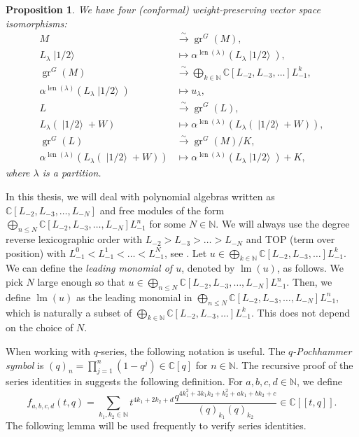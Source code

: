 \documentclass[a4paper, 12pt, reqno]{amsart}
\newtheorem{proposition}[theorem]{Proposition}
\theoremstyle{remark}
\DeclareMathOperator{\gr}{gr}
\DeclareMathOperator{\lm}{lm}
\DeclareMathOperator{\len}{len}
\DeclareMathOperator{\vachalf}{|1/2\rangle}
\begin{document}
\begin{proposition}
  \label{prp:20}
  We have four (conformal) weight-preserving vector space isomorphisms:
  \begin{align*}
    M &\xrightarrow{\sim} \gr^G(M), \\
    L_{\lambda}\vachalf &\mapsto \alpha^{\len(\lambda)}(L_{\lambda}\vachalf), \\
    \gr^G(M) &\xrightarrow{\sim} \bigoplus_{k \in \mathbb{N}}\mathbb{C}[L_{-2}, L_{-3}, \dots]L_{-1}^k, \\
    \alpha^{\len(\lambda)}(L_{\lambda}\vachalf) &\mapsto u_{\lambda}, \\
    L &\xrightarrow{\sim} \gr^G(L), \\
    L_{\lambda}(\vachalf + W) &\mapsto \alpha^{\len(\lambda)}(L_{\lambda}(\vachalf + W)), \\
    \gr^G(L) &\xrightarrow{\sim} \gr^G(M)/K, \\
    \alpha^{\len(\lambda)}(L_{\lambda}(\vachalf + W)) &\mapsto \alpha^{\len(\lambda)}(L_{\lambda}\vachalf) + K,
  \end{align*}
  where $\lambda$ is a partition.
\end{proposition}

In this thesis, we will deal with polynomial algebras written as $\mathbb{C}[L_{-2}, L_{-3}, \dots, L_{-N}]$ and free modules of the form $\bigoplus_{n \le N}\mathbb{C}[L_{-2}, L_{-3}, \dots, L_{-N}]L_{-1}^n$ for some $N \in \mathbb{N}$.
We will always use the degree reverse lexicographic order with $L_{-2} > L_{-3} > \dots > L_{-N}$ and TOP (term over position) with $L_{-1}^0 < L_{-1}^1 < \dots < L_{-1}^N$, see \cite[\S3.5]{adams_introduction_1994}.
Let $u \in \bigoplus_{k \in \mathbb{N}}\mathbb{C}[L_{-2}, L_{-3}, \dots]L_{-1}^k$.
We can define the \emph{leading monomial of $u$}, denoted by $\lm(u)$, as follows.
We pick $N$ large enough so that $u \in \bigoplus_{n \le N}\mathbb{C}[L_{-2}, L_{-3}, \dots, L_{-N}]L_{-1}^n$.
Then, we define $\lm(u)$ as the leading monomial in $\bigoplus_{n \le N}\mathbb{C}[L_{-2}, L_{-3}, \dots, L_{-N}]L_{-1}^n$, which is naturally a subset of $\bigoplus_{k \in \mathbb{N}}\mathbb{C}[L_{-2}, L_{-3}, \dots]L_{-1}^k$.
This does not depend on the choice of $N$.

When working with $q$-series, the following notation is useful.
The \emph{$q$-Pochhammer symbol} is $(q)_n = \prod_{j = 1}^n(1 - q^j) \in \mathbb{C}[q]$ for $n \in \mathbb{N}$.
The recursive proof of the series identities in \cite{andrews_singular_2022} suggests the following definition.
For $a, b, c, d \in \mathbb{N}$, we define
\begin{equation*}
  f_{a, b, c, d}(t, q) = \sum_{k_1, k_2 \in \mathbb{N}}t^{4k_1 + 2k_2 + d}\frac{q^{4k_1^2 + 3k_1k_2 + k_2^2 + ak_1 + bk_2 + c}}{(q)_{k_1}(q)_{k_2}} \in \mathbb{C}[[t, q]].
\end{equation*}
The following lemma will be used frequently to verify series identities.
\end{document}
